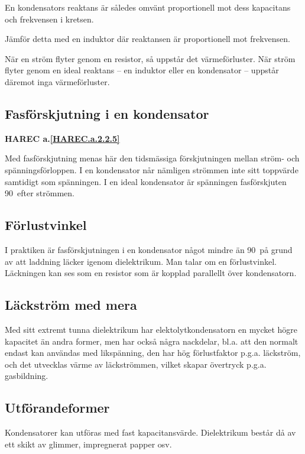 En kondensators reaktans är således omvänt proportionell mot dess kapacitans
och frekvensen i kretsen.

Jämför detta med en induktor där reaktansen är proportionell mot frekvensen.

När en ström flyter genom en resistor, så uppstår det värmeförluster. När ström
flyter genom en ideal reaktans -- en induktor eller en kondensator -- uppstår
däremot inga värmeförluster.

\subsection{Fasförskjutning i en kondensator}
\textbf{HAREC a.\ref{HAREC.a.2.2.5}\label{myHAREC.a.2.2.5}}

Med fasförskjutning menas här den tidsmässiga förskjutningen mellan ström- och
spänningsförloppen. I en kondensator når nämligen strömmen inte sitt toppvärde
samtidigt som spänningen.
I en ideal kondensator är spänningen fasförskjuten 90\degree~efter strömmen.

\subsection{Förlustvinkel}

I praktiken är fasförskjutningen i en kondensator något mindre än 90\degree~på
grund av att laddning läcker igenom dielektrikum. Man talar om en förlustvinkel.
Läckningen kan ses som en resistor som är kopplad parallellt över kondensatorn.

\subsection{Läckström med mera}

Med sitt extremt tunna dielektrikum har elektolytkondensatorn en mycket högre
kapacitet än andra former, men har också några nackdelar, bl.a. att den normalt
endast kan användas med likspänning, den har hög förlustfaktor p.g.a. läckström,
och det utvecklas värme av läckströmmen, vilket skapar övertryck p.g.a.
gasbildning.

\subsection{Utförandeformer}

Kondensatorer kan utföras med fast kapacitansvärde.
Dielektrikum består då av ett skikt av glimmer, impregnerat papper osv.

